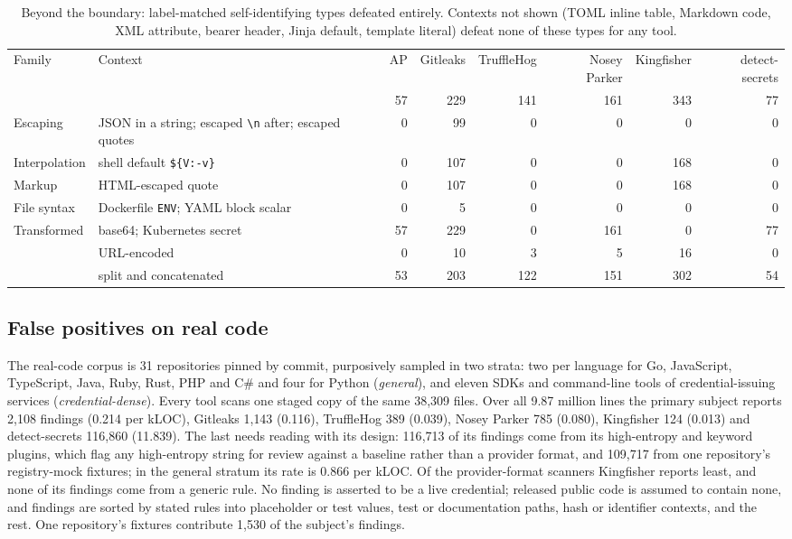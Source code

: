 \documentclass[10pt,journal,compsoc]{IEEEtran}
\begin{document}
\begin{table}[t]
\centering
\caption{Beyond the boundary: label-matched self-identifying types defeated entirely. Contexts not shown (TOML inline table, Markdown code, XML attribute, bearer header, Jinja default, template literal) defeat none of these types for any tool.}
\label{tab:encoding}
\footnotesize
\setlength{\tabcolsep}{4pt}
\begin{tabular}{@{}llrrrrrr@{}}
\toprule
Family & Context & AP & Gitleaks & TruffleHog & Nosey Parker & Kingfisher & detect-secrets \\
 & & 57 & 229 & 141 & 161 & 343 & 77 \\
\midrule
Escaping & JSON in a string; escaped \verb|\n| after; escaped quotes & 0 & 99 & 0 & 0 & 0 & 0 \\
Interpolation & shell default \texttt{\$\{V:-v\}} & 0 & 107 & 0 & 0 & 168 & 0 \\
Markup & HTML-escaped quote & 0 & 107 & 0 & 0 & 168 & 0 \\
File syntax & Dockerfile \texttt{ENV}; YAML block scalar & 0 & 5 & 0 & 0 & 0 & 0 \\
Transformed & base64; Kubernetes secret & 57 & 229 & 0 & 161 & 0 & 77 \\
 & URL-encoded & 0 & 10 & 3 & 5 & 16 & 0 \\
 & split and concatenated & 53 & 203 & 122 & 151 & 302 & 54 \\
\bottomrule
\end{tabular}
\end{table}

\subsection{False positives on real code}
\label{sec:fp}

The real-code corpus is 31 repositories pinned by commit, purposively sampled in two strata: two per language for Go, JavaScript, TypeScript, Java, Ruby, Rust, PHP and C\# and four for Python (\emph{general}), and eleven SDKs and command-line tools of credential-issuing services (\emph{credential-dense}). Every tool scans one staged copy of the same 38{,}309 files. Over all 9.87 million lines the primary subject reports 2{,}108 findings (0.214 per kLOC), Gitleaks 1{,}143 (0.116), TruffleHog 389 (0.039), Nosey Parker 785 (0.080), Kingfisher 124 (0.013) and detect-secrets 116{,}860 (11.839). The last needs reading with its design: 116{,}713 of its findings come from its high-entropy and keyword plugins, which flag any high-entropy string for review against a baseline rather than a provider format, and 109{,}717 from one repository's registry-mock fixtures; in the general stratum its rate is 0.866 per kLOC. Of the provider-format scanners Kingfisher reports least, and none of its findings come from a generic rule. No finding is asserted to be a live credential; released public code is assumed to contain none, and findings are sorted by stated rules into placeholder or test values, test or documentation paths, hash or identifier contexts, and the rest. One repository's fixtures contribute 1{,}530 of the subject's findings.
\end{document}
